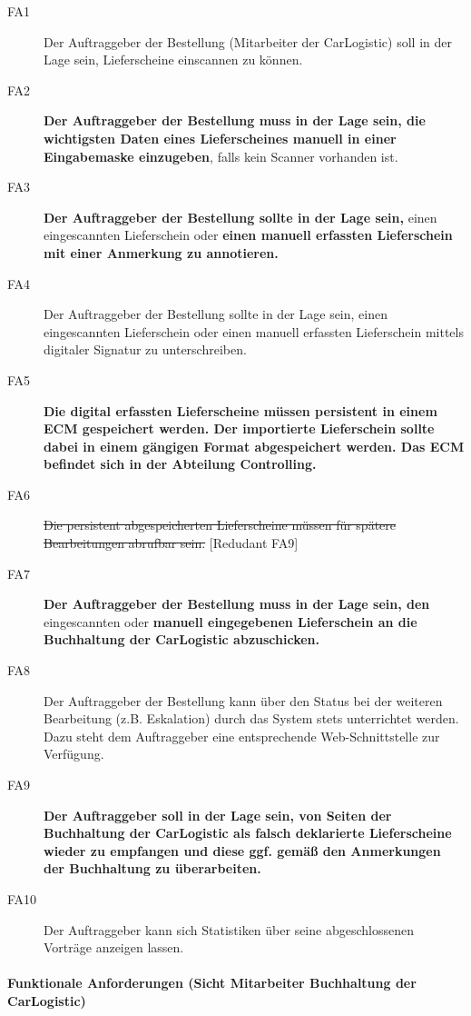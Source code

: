 \begin{description}
  \item[FA1] Der Auftraggeber der Bestellung (Mitarbeiter der CarLogistic) soll in der Lage sein, Lieferscheine einscannen zu können.
  \item[FA2] \textbf{Der Auftraggeber der Bestellung muss in der Lage sein, die wichtigsten Daten eines Lieferscheines manuell in einer Eingabemaske einzugeben}, falls kein Scanner vorhanden ist.
  \item[FA3] \textbf{Der Auftraggeber der Bestellung sollte in der Lage sein,} einen eingescannten Lieferschein oder \textbf{einen manuell erfassten Lieferschein mit einer Anmerkung zu annotieren.}
  \item[FA4] Der Auftraggeber der Bestellung sollte in der Lage sein, einen eingescannten Lieferschein oder einen manuell erfassten Lieferschein mittels digitaler Signatur zu unterschreiben.
  \item[FA5] \textbf{Die digital erfassten Lieferscheine müssen persistent in einem ECM gespeichert werden. Der importierte Lieferschein sollte dabei in einem gängigen Format abgespeichert werden. Das ECM befindet sich in der Abteilung Controlling.}
  \item[FA6] \sout{Die persistent abgespeicherten Lieferscheine müssen für spätere Bearbeitungen abrufbar sein.} [Redudant FA9]
  \item[FA7] \textbf{Der Auftraggeber der Bestellung muss in der Lage sein, den} eingescannten oder \textbf{manuell eingegebenen Lieferschein an die Buchhaltung der CarLogistic abzuschicken.}
  \item[FA8] Der Auftraggeber der Bestellung kann über den Status bei der weiteren Bearbeitung (z.B. Eskalation) durch das System stets unterrichtet werden. Dazu steht dem Auftraggeber eine entsprechende Web-Schnittstelle zur Verfügung.
  \item[FA9] \textbf{Der Auftraggeber soll in der Lage sein, von Seiten der Buchhaltung der CarLogistic als falsch deklarierte Lieferscheine wieder zu empfangen und diese ggf. gemäß den Anmerkungen der Buchhaltung zu überarbeiten.}
  \item[FA10] Der Auftraggeber kann sich Statistiken über seine abgeschlossenen Vorträge anzeigen lassen.
\end{description}

\paragraph{Funktionale Anforderungen (Sicht Mitarbeiter Buchhaltung der CarLogistic)}

